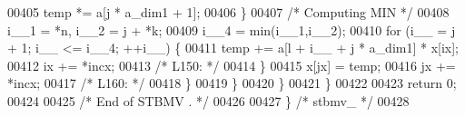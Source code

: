 \begin{DoxyCode}
00405             temp *= a[j * a\_dim1 + 1];
00406             \}
00407 \textcolor{comment}{/* Computing MIN */}
00408             i\_\_1 = *n, i\_\_2 = j + *k;
00409             i\_\_4 = min(i\_\_1,i\_\_2);
00410             \textcolor{keywordflow}{for} (i\_\_ = j + 1; i\_\_ <= i\_\_4; ++i\_\_) \{
00411             temp += a[l + i\_\_ + j * a\_dim1] * x[ix];
00412             ix += *incx;
00413 \textcolor{comment}{/* L150: */}
00414             \}
00415             x[jx] = temp;
00416             jx += *incx;
00417 \textcolor{comment}{/* L160: */}
00418         \}
00419         \}
00420     \}
00421     \}
00422 
00423     \textcolor{keywordflow}{return} 0;
00424 
00425 \textcolor{comment}{/*     End of STBMV . */}
00426 
00427 \} \textcolor{comment}{/* stbmv\_ */}
00428 
\end{DoxyCode}
